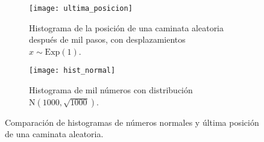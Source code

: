 \documentclass[12pt,letterpaper]{article}
\begin{document}
\begin{figure}
	\centering
	\begin{subfigure}{0.45\linewidth}
		\texttt{[image: ultima\_posicion]}
		\caption{Histograma de la posición de una caminata aleatoria después de mil pasos, con desplazamientos $x \sim \mathrm{Exp}(1)$.}
		\label{fig:hist_ultima_posicion}
	\end{subfigure}
	\hfill
	\begin{subfigure}{0.45\linewidth}
		\texttt{[image: hist\_normal]}
		\caption{Histograma de mil números con distribución $\mathrm{N}(1000, \sqrt{1000})$.}
		\label{fig:hist_normal}
	\end{subfigure}
	\caption{Comparación de histogramas de números normales y última posición de una caminata aleatoria.} 
	\label{fig:histogramas}
\end{figure}

 

\end{document}
